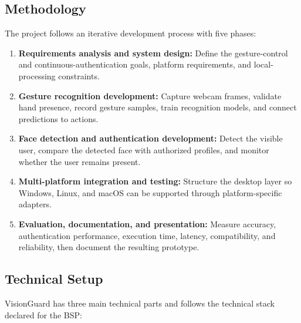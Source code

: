 \documentclass[10pt,twocolumn]{article}
\begin{document}
\subsection{Methodology}
The project follows an iterative development process with five phases:

\begin{enumerate}[leftmargin=*]
  \item \textbf{Requirements analysis and system design:} Define the gesture-control and continuous-authentication goals, platform requirements, and local-processing constraints.
  \item \textbf{Gesture recognition development:} Capture webcam frames, validate hand presence, record gesture samples, train recognition models, and connect predictions to actions.
  \item \textbf{Face detection and authentication development:} Detect the visible user, compare the detected face with authorized profiles, and monitor whether the user remains present.
  \item \textbf{Multi-platform integration and testing:} Structure the desktop layer so Windows, Linux, and macOS can be supported through platform-specific adapters.
  \item \textbf{Evaluation, documentation, and presentation:} Measure accuracy, authentication performance, execution time, latency, compatibility, and reliability, then document the resulting prototype.
\end{enumerate}

\subsection{Technical Setup}
VisionGuard has three main technical parts and follows the technical stack declared for the BSP:
\end{document}
